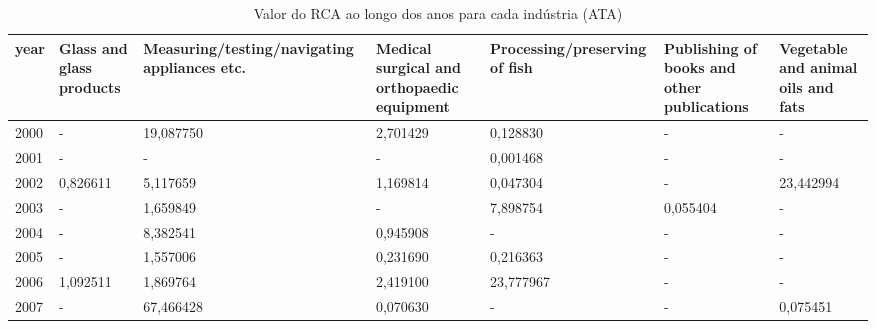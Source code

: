 \begin{table}
\centering
\caption{Valor do RCA ao longo dos anos para cada indústria (ATA)}
\begin{tabular}{p{1cm}p{2cm}p{2cm}p{2cm}p{2cm}p{2cm}p{2cm}}
\toprule
 year &  Glass and glass products &  Measuring/testing/navigating appliances etc. &  Medical surgical and orthopaedic equipment &  Processing/preserving of fish &  Publishing of books and other publications &  Vegetable and animal oils and fats \\
\midrule
 2000 &                         - &                                     19,087750 &                                    2,701429 &                       0,128830 &                                           - &                                   - \\
 2001 &                         - &                                             - &                                           - &                       0,001468 &                                           - &                                   - \\
 2002 &                  0,826611 &                                      5,117659 &                                    1,169814 &                       0,047304 &                                           - &                           23,442994 \\
 2003 &                         - &                                      1,659849 &                                           - &                       7,898754 &                                    0,055404 &                                   - \\
 2004 &                         - &                                      8,382541 &                                    0,945908 &                              - &                                           - &                                   - \\
 2005 &                         - &                                      1,557006 &                                    0,231690 &                       0,216363 &                                           - &                                   - \\
 2006 &                  1,092511 &                                      1,869764 &                                    2,419100 &                      23,777967 &                                           - &                                   - \\
 2007 &                         - &                                     67,466428 &                                    0,070630 &                              - &                                           - &                            0,075451 \\

\end{tabular}
\end{table}

